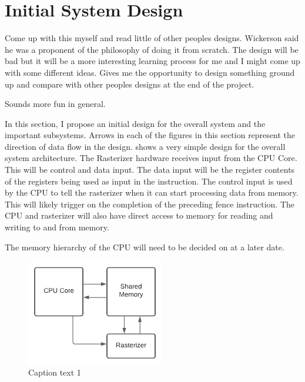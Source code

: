 \section{Initial System Design}

Come up with this myself and read little of other peoples designs. Wickerson said he was a proponent of the philosophy of doing it from scratch. The design will be bad but it will be a more interesting learning process for me and I might come up with some different ideas. Gives me the opportunity to design something ground up and compare with other peoples designs at the end of the project.

Sounds more fun in general.

In this section, I propose an initial design for the overall system and the important subsystems. Arrows in each of the figures in this section represent the direction of data flow in the design.  shows a very simple design for the overall system architecture. 
The Rasterizer hardware receives input from the CPU Core. This will be control and data input. The data input will be the register contents of the registers being used as input in the instruction. The control input is used by the CPU to tell the rasterizer when it can start processing data from memory. This will likely trigger on the completion of the preceding fence instruction.  
The CPU and rasterizer will also have direct access to memory for reading and writing to and from memory. 

The memory hierarchy of the CPU will need to be decided on at a later date. 

\begin{figure}[ht]
    \centering\includegraphics[width=6cm]{functional_spec/images/SysMemShared.png}
    \caption{Caption text 1}
    \label{fig:SysMemShared}
\end{figure}

